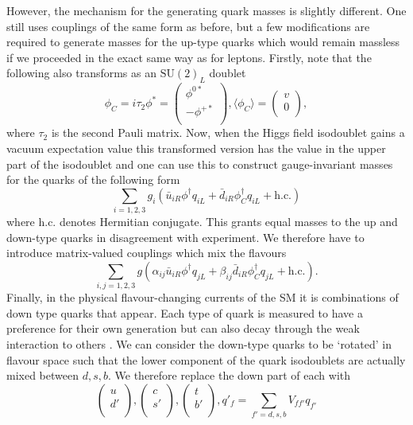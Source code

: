 However, the mechanism for the generating quark masses is slightly different. One still uses couplings of the same form as before, but a few modifications are required \cite{PDG} to generate masses for the up-type quarks which would remain massless if we proceeded in the exact same way as for leptons. Firstly, note that the following also transforms as an $\mathrm{SU}(2)_{L}$ doublet 
\begin{equation}
    \phi_{C} = i\tau_{2}\phi^{*} = 
    \begin{pmatrix}
        \phi^{0*} \\
        -\phi^{+*}\\
    \end{pmatrix},
    \langle{\phi_{C}}\rangle = 
    \begin{pmatrix} 
        v \\ 
        0 \\ 
    \end{pmatrix},
\end{equation}
where $\tau_{2}$ is the second Pauli matrix. Now, when the Higgs field isodoublet gains a vacuum expectation value this transformed version has the value in the upper part of the isodoublet and one can use this to construct gauge-invariant masses for the quarks of the following form
\begin{equation}
    \sum_{i=1,2,3}g_{i}(
    \bar{u}_{iR}\phi^{\dag}q_{iL} 
    + \bar{d}_{iR}\phi^{\dag}_{C}q_{iL}
    + \mathrm{h.c.})
\end{equation}
where h.c. denotes Hermitian conjugate. This grants equal masses to the up and down-type quarks in disagreement with experiment. We therefore have to introduce matrix-valued couplings which mix the flavours
\begin{equation}
    \sum_{i,j=1,2,3}g(
      \alpha_{ij}\bar{u}_{iR}\phi^{\dag}q_{jL} 
      + \beta_{ij}\bar{d}_{iR}\phi^{\dag}_{C}q_{jL}
      + \mathrm{h.c.}).
\end{equation}
Finally, in the physical flavour-changing currents of the SM it is combinations of down type quarks that appear. Each type of quark is measured to have a preference for their own generation but can also decay through the weak interaction to others \cite{PDG}. We can consider the down-type quarks to be `rotated' in flavour space such that the lower component of the quark isodoublets are actually mixed between $d,s,b$. We therefore replace the down part of each with 
\begin{equation}
    \begin{pmatrix}
        u \\
        d{'} \\
    \end{pmatrix},
    \begin{pmatrix}
        c \\
        s{'} \\
    \end{pmatrix},
    \begin{pmatrix}
        t \\
        b{'} \\
    \end{pmatrix},
    q{'}_{f} = \sum_{f'=d,s,b}V_{ff'}q_{f'}
\end{equation}
